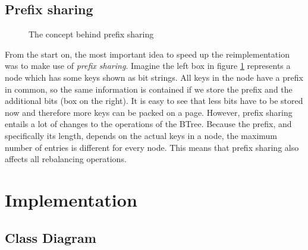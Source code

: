\documentclass[11pt,a4paper,oneside]{article}
\begin{document}
\subsection{Prefix sharing}
\begin{figure}[ht]
\center
{}
\caption{The concept behind prefix sharing}
\label{fig:prefix-sharing}
\end{figure}

From the start on, the most important idea to speed up the reimplementation was to make use of \emph{prefix sharing}.
Imagine the left box in figure \ref{fig:prefix-sharing} represents a node which has some keys shown as bit strings.
All keys in the node have a prefix in common, so the same information is contained if we store the prefix and the additional bits (box on the right).
It is easy to see that less bits have to be stored now and therefore more keys can be packed on a page.
However, prefix sharing entails a lot of changes to the operations of the BTree. 
Because the prefix, and specifically its length, depends on the actual keys in a node, the maximum number of entries is different for every node.
This means that prefix sharing also affects all rebalancing operations.


\section{Implementation}
\subsection{Class Diagram} %
\label{sub:class_diagram}
\end{document}
